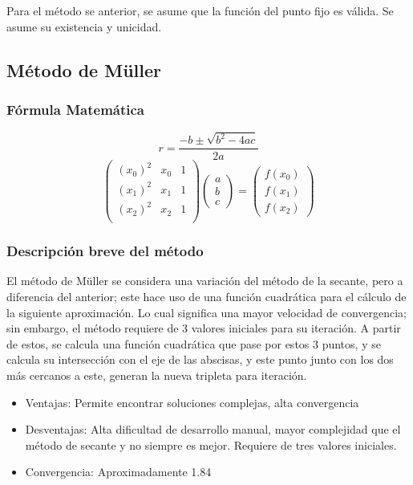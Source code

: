\documentclass[12pt]{article}
\begin{document}
Para el método se anterior, se asume que la función del punto fijo es válida. Se asume su existencia y unicidad.


\subsection{Método de Müller}

\subsubsection{Fórmula Matemática}

\[r = \frac{-b \pm \sqrt{b^2 - 4ac}}{2a} \]
\[ \left( \begin{array}{ccc}
(x_0)^2 & x_0 & 1\\
(x_1)^2 & x_1 & 1\\
(x_2)^2 & x_2 & 1\\
\end{array} \right)
%
\left( \begin{array}{c}
a \\
b \\
c
\end{array} \right)
=
\left( \begin{array}{c}
f(x_0) \\
f(x_1) \\
f(x_2)
\end{array} \right)
\]




\subsubsection{Descripción breve del método}
El método de Müller se considera una variación del método de la secante, pero a diferencia del anterior; este hace uso de una función cuadrática para el cálculo de la siguiente aproximación. Lo cual significa una mayor velocidad de convergencia; sin embargo, el método requiere de 3 valores iniciales para su iteración. A partir de estos, se calcula una función cuadrática que pase por estos 3 puntos, y se calcula su intersección con el eje de las abscisas, y este punto junto con los dos más cercanos a este, generan la nueva tripleta para iteración.

\begin{itemize}
    \item Ventajas: Permite encontrar soluciones complejas, alta convergencia
    \item Desventajas: Alta dificultad de desarrollo manual, mayor complejidad que el método de secante y no siempre es mejor. Requiere de tres valores iniciales.
    \item Convergencia: Aproximadamente 1.84 
\end{itemize}
\end{document}
